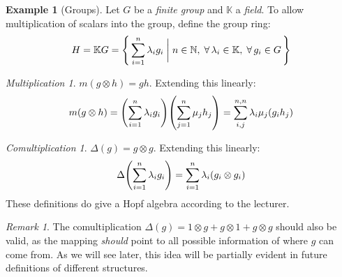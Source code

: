 \documentclass{article}
\theoremstyle{definition}
\newtheorem{Example}{Example}
\theoremstyle{remark}
\newtheorem*{Remark*}{Remark}
\theoremstyle{underline}
\newtheorem*{Multiplication*}{Multiplication}
\theoremstyle{underline}
\newtheorem*{Comultiplication*}{Comultiplication}
\begin{document}
\begin{Example}[Groups]
Let $G$ be a \emph{finite group} and $\mathbb{K}$ a \emph{field}. To allow multiplication of scalars into the group, define the group ring:
\begin{gather}
	H = \mathbb KG = \qty{\, \sum_{i = 1}^n\lambda_i g_i \biggm| n \in \mathbb N,\; \forall\,\lambda_i \in \mathbb K,\; \forall\,g_i \in G \,}	
\end{gather}

\begin{Multiplication*}
$m(g \otimes h) = gh$. Extending this linearly:
\begin{gather}
	m(g \otimes h) = \pqty{\sum_{i = 1}^{n}\lambda_i g_i}\pqty{\sum_{j = 1}^{n}\mu_j h_j} = \sum_{i,j}^{n,n} \lambda_i \mu_j(g_i h_j)
\end{gather}
\end{Multiplication*}

\begin{Comultiplication*}
$ \Delta(g) = g \otimes g $. Extending this linearly:
\begin{gather}
	\Delta\pqty{\sum_{i = 1}^n \lambda_ig_i} = \sum_{i = 1}^n \lambda_i(g_i \otimes g_i)
\end{gather}
These definitions do give a Hopf algebra according to the lecturer. 	
\end{Comultiplication*}

\begin{Remark*}
The comultiplication $ \Delta(g) = 1 \otimes g + g \otimes 1 + g \otimes g$ should also be valid, as the mapping \emph{should} point to all possible information of where $g$ can come from. As we will see later, this idea will be partially evident in future definitions of different structures.
\end{Remark*}

\end{Example}
\end{document}
